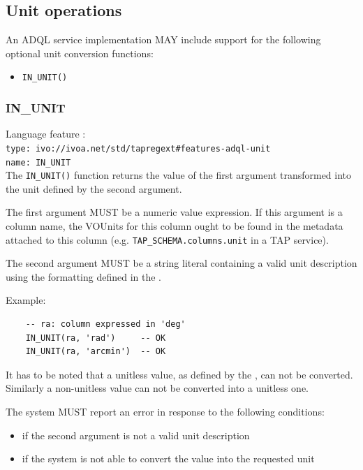 \documentclass[11pt,a4paper]{ivoa}
\begin{document}
\subsection{Unit operations}
\label{sec:unit}

An ADQL service implementation MAY include support for the following optional
unit conversion functions:

\begin{itemize}
    \item \verb:IN_UNIT():
\end{itemize}

\subsubsection{IN\_UNIT}
\label{sec:unit.in_unit}
{\footnotesize Language feature :}\\
{\footnotesize \verb|type: ivo://ivoa.net/std/tapregext#features-adql-unit|}\\
{\footnotesize \verb|name: IN_UNIT|}\\

The \verb:IN_UNIT(): function returns the value of the first argument
transformed into the unit defined by the second argument.

The first argument MUST be a numeric value expression. If this argument is a
column name, the VOUnits for this column ought to be found in the metadata
attached to this column (e.g. \verb|TAP_SCHEMA.columns.unit| in a TAP service).

The second argument MUST be a string literal containing a valid unit
description using the formatting defined in the \VOUnitSpec{}.

Example:

\begin{verbatim}
    -- ra: column expressed in 'deg'
    IN_UNIT(ra, 'rad')     -- OK
    IN_UNIT(ra, 'arcmin')  -- OK
\end{verbatim}

It has to be noted that a unitless value, as defined by the \VOUnitSpec{}, can not
be converted. Similarly a non-unitless value can not be converted into a
unitless one.

The system MUST report an error in response to the following conditions:
\begin{itemize}
    \item if the second argument is not a valid unit description
    \item if the system is not able to convert the value into the requested unit
\end{itemize}
\end{document}
